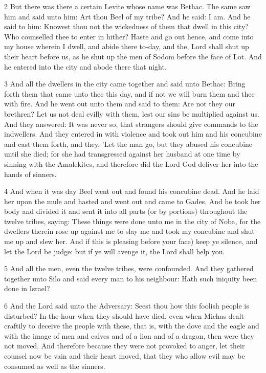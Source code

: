 \par 2 But there was there a certain Levite whose name was Bethac. The same saw him and said unto him: Art thou Beel of my tribe? And he said: I am. And he said to him: Knowest thou not the wickedness of them that dwell in this city? Who counselled thee to enter in hither? Haste and go out hence, and come into my house wherein I dwell, and abide there to-day, and the, Lord shall shut up their heart before us, as he shut up the men of Sodom before the face of Lot. And he entered into the city and abode there that night. 

\par 3 And all the dwellers in the city came together and said unto Bethac: Bring forth them that came unto thee this day, and if not we will burn them and thee with fire. And he went out unto them and said to them: Are not they our brethren? Let us not deal evilly with them, lest our sins be multiplied against us. And they answered: It was never so, that strangers should give commands to the indwellers. And they entered in with violence and took out him and his concubine and cast them forth, and they, 'Let the man go, but they abused his concubine until she died; for she had transgressed against her husband at one time by sinning with the Amalekites, and therefore did the Lord God deliver her into the hands of sinners.

\par 4 And when it was day Beel went out and found his concubine dead. And he laid her upon the mule and hasted and went out and came to Gades. And he took her body and divided it and sent it into all parts (or by portions) throughout the twelve tribes, saying: These things were done unto me in the city of Noba, for the dwellers therein rose up against me to slay me and took my concubine and shut me up and slew her. And if this is pleasing before your face) keep ye silence, and let the Lord be judge: but if ye will avenge it, the Lord shall help you. 

\par 5 And all the men, even the twelve tribes, were confounded. And they gathered together unto Silo and said every man to his neighbour: Hath such iniquity been done in Israel?

\par 6 And the Lord said unto the Adversary: Seest thou how this foolish people is disturbed? In the hour when they should have died, even when Michas dealt craftily to deceive the people with these, that is, with the dove and the eagle and with the image of men and calves and of a lion and of a dragon, then were they not moved. And therefore because they were not provoked to anger, let their counsel now be vain and their heart moved, that they who allow evil may be consumed as well as the sinners.

